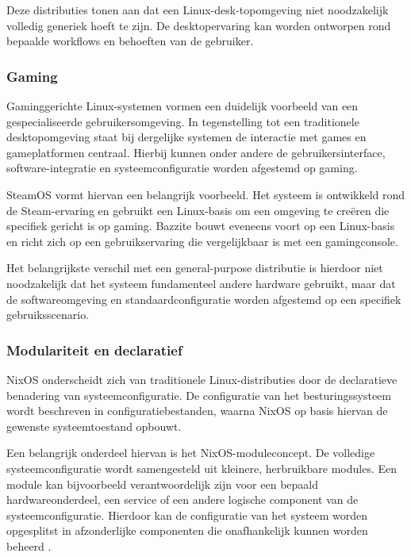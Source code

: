 \documentclass{hogent-article}
\begin{document}
Deze distributies tonen aan dat een Linux-desk-topomgeving niet noodzakelijk volledig generiek hoeft te zijn. De desktopervaring kan worden ontworpen rond bepaalde workflows en behoeften van de gebruiker.

\subsubsection{Gaming}
\label{sssec:gaming}

Gaminggerichte Linux-systemen vormen een duidelijk voorbeeld van een gespecialiseerde gebruikersomgeving. In tegenstelling tot een traditionele desktopomgeving staat bij dergelijke systemen de interactie met games en gameplatformen centraal. Hierbij kunnen onder andere de gebruikersinterface, software-integratie en systeemconfiguratie worden afgestemd op gaming.

SteamOS vormt hiervan een belangrijk voorbeeld. Het systeem is ontwikkeld rond de Steam-ervaring en gebruikt een Linux-basis om een omgeving te creëren die specifiek gericht is op gaming. Bazzite bouwt eveneens voort op een Linux-basis en richt zich op een gebruikservaring die vergelijkbaar is met een gamingconsole.

Het belangrijkste verschil met een general-purpose distributie is hierdoor niet noodzakelijk dat het systeem fundamenteel andere hardware gebruikt, maar dat de softwareomgeving en standaardconfiguratie worden afgestemd op een specifiek gebruiksscenario.

\subsubsection{Modulariteit en declaratief}
\label{sssec:modulariteit}

NixOS onderscheidt zich van traditionele Linux-distributies door de declaratieve benadering van systeemconfiguratie. De configuratie van het besturingssysteem wordt beschreven in configuratiebestanden, waarna NixOS op basis hiervan de gewenste systeemtoestand opbouwt.

Een belangrijk onderdeel hiervan is het NixOS-moduleconcept. De volledige systeemconfiguratie wordt samengesteld uit kleinere, herbruikbare modules. Een module kan bijvoorbeeld verantwoordelijk zijn voor een bepaald hardwareonderdeel, een service of een andere logische component van de systeemconfiguratie. Hierdoor kan de configuratie van het systeem worden opgesplitst in afzonderlijke componenten die onafhankelijk kunnen worden beheerd \autocite{Nixos}.
\end{document}
